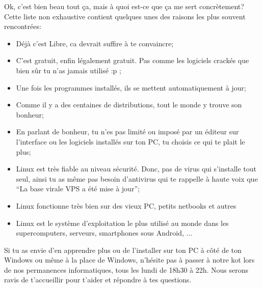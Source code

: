\documentclass[12pt]{../fiche}
\begin{document}
Ok, c'est bien beau tout ça, mais à quoi est-ce que ça me sert concrètement?
Cette liste non exhaustive contient quelques unes des raisons les plus souvent rencontrées:
\begin{itemize}
\item Déjà c’est Libre, ca devrait suffire à te convaincre;
\item C'est gratuit, enfin légalement gratuit. Pas comme les logiciels crackés que bien sûr tu n’as jamais utilisé :p ;
\item Une fois les programmes installés, ils se mettent automatiquement à jour;
\item Comme il y a des centaines de distributions, tout le monde y trouve son bonheur;
\item En parlant de bonheur, tu n’es pas limité ou imposé par un éditeur sur l’interface ou les logiciels installés sur ton PC, tu choisis ce qui te plait le plus;
\item Linux est très fiable au niveau sécurité. Donc, pas de virus qui s’installe tout seul, ainsi tu as même pas besoin d'antivirus qui te rappelle à haute voix que “La base virale VPS a été mise à jour”;
\item Linux fonctionne très bien sur des vieux PC, petits netbooks et autres
\item Linux est le système d’exploitation le plus utilisé au monde dans les supercomputers, serveurs, smartphones sous Android, ... 
\end{itemize}
\vspace{0.8em}

Si tu as envie d’en apprendre plus ou de l’installer sur ton PC à côté de ton Windows ou même à la place de Windows, n’hésite pas à passer à notre kot lors de nos permanences informatiques, tous les lundi de 18h30 à 22h. Nous serons ravis de t’accueillir pour t’aider et répondre à tes questions.
\end{document}
